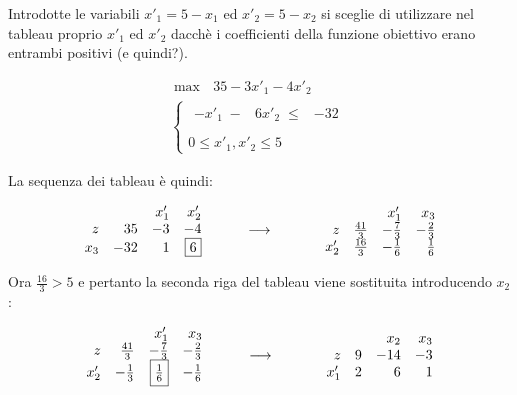 \documentclass[10pt]{article}
\begin{document}
Introdotte le variabili
$x'_1 = 5 - x_1$ ed $x'_2 = 5 - x_2$
si sceglie di utilizzare nel tableau
proprio $x'_1$ ed $x'_2$ dacch\`e
i coefficienti della funzione obiettivo erano
entrambi positivi (e quindi?).

\[
   \begin{array}{l}
        \max \mbox{\ } 35 - 3x'_1 - 4x'_2 \\
        \left\{
        \begin{array}{l}
        \begin{array}{rrrr}
             -x'_1 \;-&  6x'_2 \;\leq & -32 \\
        \end{array} \\
        0 \leq x'_1, x'_2  \leq 5    
        \end{array}
        \right.
   \end{array}
\]

La sequenza dei tableau \`e quindi:

\[
   \begin{array}{rrrr}
         & & x'_1  & x'_2 \\
       z  &  35 &  -3  &  -4 \\         
      x_3 & -32  & 1 &  \fbox{$6$}  \\
   \end{array}
\hfill
\hspace{1cm}
{\longrightarrow}
\hfill
\hspace{1.2cm}
   \begin{array}{rrrr}
         & & x'_1  & x_3 \\
       z   & \frac{41}{3} &  -\frac{7}{3} & -\frac{2}{3}  \\         
      x'_2 & \frac{16}{3} & -\frac{1}{6} & \frac{1}{6}  \\
   \end{array}
\]

Ora $\frac{16}{3} > 5$ e pertanto la seconda riga del
tableau viene sostituita introducendo $x_2$:

\[
   \begin{array}{rrrr}
           & & x'_1  & x_3 \\
       z   & \frac{41}{3} &  -\frac{7}{3} & -\frac{2}{3}  \\      
      x'_2 & -\frac{1}{3} & \fbox{$\frac{1}{6}$} & -\frac{1}{6}  \\
   \end{array}
\hfill
\hspace{1cm}
{\longrightarrow}
\hfill
\hspace{1.2cm}
   \begin{array}{rrrr}
           & & x_2  & x_3 \\
       z   & 9 &  -14 & -3  \\           
      x'_1 & 2 & 6 & 1  \\
   \end{array}
\]
\end{document}
